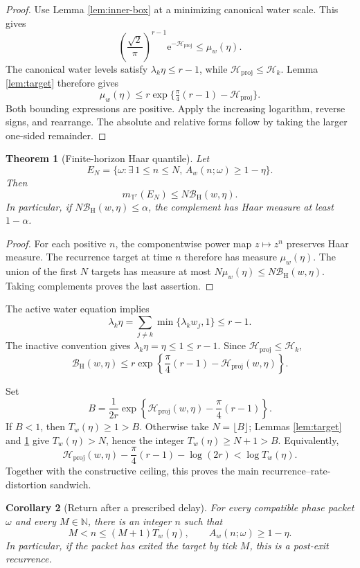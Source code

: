 \documentclass[10pt]{article}
\newtheorem{theorem}{Theorem}[section]
\newtheorem{corollary}[theorem]{Corollary}
\theoremstyle{definition}
\newcommand{\N}{\mathbb N}
\newcommand{\T}{\mathbb T}
\newcommand{\proj}{\mathrm{proj}}
\newcommand{\Hwater}{\mathcal H}
\newcommand{\Bhaar}{\mathcal B_{\mathrm H}}
\newcommand{\ee}{\mathrm e}
\begin{document}
\begin{proof}
Use Lemma \ref{lem:inner-box} at a minimizing canonical water scale.  This
gives
\[
 \left(\frac{\sqrt2}{\pi}\right)^{r-1}
 \ee^{-\Hwater_{\proj}}\leq\mu_w(\eta).
\]
The canonical water levels satisfy \(\lambda_k\eta\leq r-1\), while
\(\Hwater_{\proj}\leq\Hwater_k\).  Lemma \ref{lem:target} therefore gives
\[
 \mu_w(\eta)\leq
 r\exp\{\tfrac{\pi}{4}(r-1)-\Hwater_{\proj}\}.
\]
Both bounding expressions are positive.  Apply the increasing logarithm,
reverse signs, and rearrange.  The absolute and relative forms follow by
taking the larger one-sided remainder.
\end{proof}

\begin{theorem}[Finite-horizon Haar quantile]
\label{lem:avoid}
Let
\[
 E_N=\{\omega:\exists\,1\leq n\leq N,\,
 A_w(n;\omega)\geq1-\eta\}.
\]
Then
\[
 m_{\T^r}(E_N)\leq N\Bhaar(w,\eta).
\]
In particular, if \(N\Bhaar(w,\eta)\leq\alpha\), the complement has Haar
measure at least \(1-\alpha\).
\end{theorem}

\begin{proof}
For each positive \(n\), the componentwise power map \(z\mapsto z^n\)
preserves Haar measure.  The recurrence target at time \(n\) therefore has
measure \(\mu_w(\eta)\).  The union of the first \(N\) targets has measure at
most \(N\mu_w(\eta)\leq N\Bhaar(w,\eta)\).  Taking complements proves the
last assertion.
\end{proof}

The active water equation implies
\[
 \lambda_k\eta
 =\sum_{j\ne k}\min\{\lambda_kw_j,1\}\leq r-1.
\]
The inactive convention gives
\(\lambda_k\eta=\eta\leq1\leq r-1\).  Since
\(\Hwater_{\proj}\leq\Hwater_k\),
\[
 \Bhaar(w,\eta)\leq
 r\exp\left\{\frac{\pi}{4}(r-1)-\Hwater_{\proj}(w,\eta)\right\}.
\]

Set
\[
 B=\frac{1}{2r}
 \exp\left\{\Hwater_{\proj}(w,\eta)-\frac{\pi}{4}(r-1)\right\}.
\]
If \(B<1\), then \(T_w(\eta)\geq1>B\).  Otherwise take
\(N=\lfloor B\rfloor\); Lemmas \ref{lem:target} and \ref{lem:avoid} give
\(T_w(\eta)>N\), hence the integer \(T_w(\eta)\geq N+1>B\).
Equivalently,
\[
 \Hwater_{\proj}(w,\eta)-\frac{\pi}{4}(r-1)-\log(2r)
 <\log T_w(\eta).
\]
Together with the constructive ceiling, this proves the main
recurrence--rate-distortion sandwich.

\begin{corollary}[Return after a prescribed delay]
\label{cor:post-delay}
For every compatible phase packet \(\omega\) and every \(M\in\N\), there is
an integer \(n\) such that
\[
 M<n\leq(M+1)T_w(\eta),\qquad A_w(n;\omega)\geq1-\eta.
\]
In particular, if the packet has exited the target by tick \(M\), this is a
post-exit recurrence.
\end{corollary}
\end{document}
